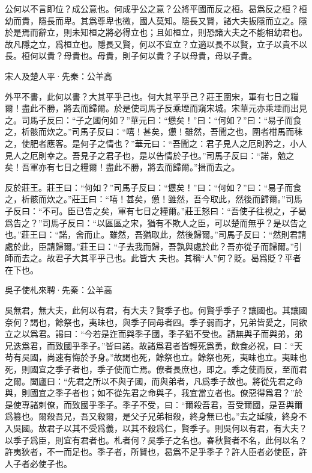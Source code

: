 \documentclass[12pt,a4paper]{ctexbook}
\begin{document}
公何以不言即位？成公意也。何成乎公之意？公將平國而反之桓。曷爲反之桓？桓幼而貴，隱長而卑。其爲尊卑也微，國人莫知。隱長又賢，諸大夫扳隱而立之。隱於是焉而辭立，則未知桓之將必得立也；且如桓立，則恐諸大夫之不能相幼君也。故凡隱之立，爲桓立也。隱長又賢，何以不宜立？立適以長不以賢，立子以貴不以長。桓何以貴？母貴也。母貴，則子何以貴？子以母貴，母以子貴。\par
宋人及楚人平·先秦：公羊高 \par
外平不書，此何以書？大其平乎己也。何大其平乎己？莊王圍宋，軍有七日之糧爾！盡此不勝，將去而歸爾。於是使司馬子反乘堙而窺宋城。宋華元亦乘堙而出見之。司馬子反曰：“子之國何如？”華元曰：“憊矣！”曰：“何如？”曰：“易子而食之，析骸而炊之。”司馬子反曰：“嘻！甚矣，憊！雖然，吾聞之也，圍者柑馬而秣之，使肥者應客。是何子之情也？”華元曰：“吾聞之：君子見人之厄則矜之，小人見人之厄則幸之。吾見子之君子也，是以告情於子也。”司馬子反曰：“諾，勉之矣！吾軍亦有七日之糧爾！盡此不勝，將去而歸爾。”揖而去之。\par
反於莊王。莊王曰：“何如？”司馬子反曰：“憊矣！”曰：“何如？”曰：“易子而食之，析骸而炊之。”莊王曰：“嘻！甚矣，憊！雖然，吾今取此，然後而歸爾。”司馬子反曰：“不可。臣已告之矣，軍有七日之糧爾。”莊王怒曰：“吾使子往視之，子曷爲告之？”司馬子反曰：“以區區之宋，猶有不欺人之臣，可以楚而無乎？是以告之也。”莊王曰：“諾，舍而止。雖然，吾猶取此，然後歸爾。”司馬子反曰：“然則君請處於此，臣請歸爾。”莊王曰：“子去我而歸，吾孰與處於此？吾亦從子而歸爾。”引師而去之。故君子大其平乎己也。此皆大 夫也。其稱“人”何？貶。曷爲貶？平者在下也。\par
吳子使札來聘·先秦：公羊高 \par
吳無君，無大夫，此何以有君，有大夫？賢季子也。何賢乎季子？讓國也。其讓國奈何？謁也，餘祭也，夷昧也，與季子同母者四。季子弱而才，兄弟皆愛之，同欲立之以爲君。謁曰：“今若是迮而與季子國，季子猶不受也。請無與子而與弟，弟兄迭爲君，而致國乎季子。”皆曰諾。故諸爲君者皆輕死爲勇，飲食必祝，曰：“天苟有吳國，尚速有悔於予身。”故謁也死，餘祭也立。餘祭也死，夷昧也立。夷昧也死，則國宜之季子者也，季子使而亡焉。僚者長庶也，即之。季之使而反，至而君之爾。闔廬曰：“先君之所以不與子國，而與弟者，凡爲季子故也。將從先君之命與，則國宜之季子者也；如不從先君之命與子，我宜當立者也。僚惡得爲君？”於是使專諸刺僚，而致國乎季子。季子不受，曰：“爾殺吾君，吾受爾國，是吾與爾爲篡也。爾殺吾兄，吾又殺爾，是父子兄弟相殺，終身無已也。”去之延陵，終身不入吳國。故君子以其不受爲義，以其不殺爲仁，賢季子。則吳何以有君，有大夫？以季子爲臣，則宜有君者也。札者何？吳季子之名也。春秋賢者不名，此何以名？許夷狄者，不一而足也。季子者，所賢也，曷爲不足乎季子？許人臣者必使臣，許人子者必使子也。\par
\end{document}
